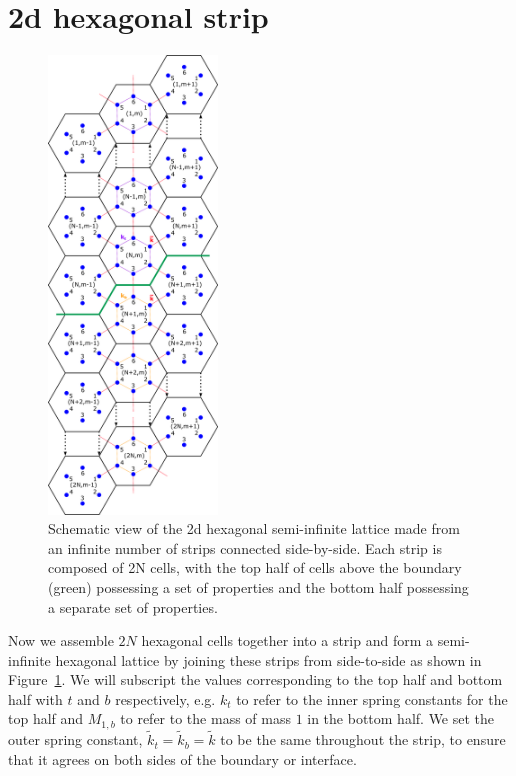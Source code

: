 \section{2d hexagonal strip}
\label{formstrip}

\begin{figure}[!h]
\centering
\includegraphics[width=0.4\textwidth]{imgs/hexstripmodel.png}
\caption{\label{fig:hexstripmodel} Schematic view of the 2d hexagonal
  semi-infinite lattice made from an infinite number of strips connected
  side-by-side. Each strip is composed of 2N cells, with the top half of cells
  above the boundary (green) possessing a set of properties and the bottom half
  possessing a separate set of properties.}
\end{figure}

Now we assemble $2N$ hexagonal cells together into a strip and form a
semi-infinite hexagonal lattice by joining these strips from side-to-side as
shown in Figure~\ref{fig:hexstripmodel}. We will subscript the values
corresponding to the top half and bottom half with $t$ and $b$ respectively,
e.g. $k_t$ to refer to the inner spring constants for the top half and
$M_{1,b}$ to refer to the mass of mass $1$ in the bottom half. We set the outer
spring constant, $\tilde{k}_t=\tilde{k}_b=\tilde{k}$ to be the same throughout
the strip, to ensure that it agrees on both sides of the boundary or interface.

